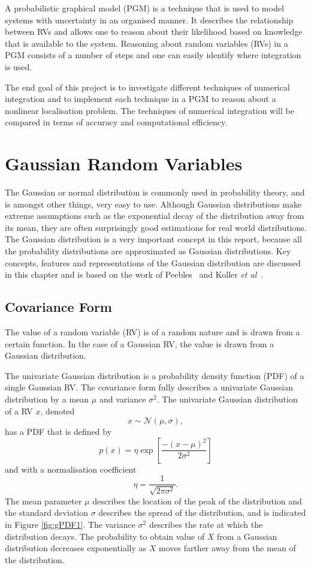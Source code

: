 \documentclass[12pt,oneside,openany,a4paper, %
afrikaans,english,
]{memoir}
\numberwithin{equation}{chapter}
\begin{document}
{A probabilistic graphical model (PGM) is a technique that is used to model systems with uncertainty in an organised manner. It describes the relationship between RVs and allows one to reason about their likelihood based on knowledge that is available to the system. Reasoning about random variables (RVs) in a PGM consists of a number of steps and one can easily identify where integration is used.

The end goal of this project is to investigate different techniques of numerical integration and to implement each technique in a PGM to reason about a nonlinear localisation problem. The techniques of numerical integration will be compared in terms of accuracy and computational efficiency.
\setcounter{secnumdepth}{2}
\chapter{Gaussian Random Variables}
The Gaussian or normal distribution is commonly used in probability theory, and is amongst other things, very easy to use. Although Gaussian distributions make extreme assumptions such as the exponential decay of the distribution away from its mean, they are often surprisingly good estimations for real world distributions. The Gaussian distribution is a very important concept in this report, because all the probability distributions are approximated as Gaussian distributions. Key concepts, features and representations of the Gaussian distribution are discussed in this chapter and is based on the work of Peebles~\cite{peebles} and Koller \textit{et al}~\cite{koller}.

\section{Covariance Form}
The value of a random variable (RV) is of a random nature and is drawn from a certain function. In the case of a Gaussian RV, the value is drawn from a Gaussian distribution.

The univariate Gaussian distribution is a probability density function (PDF) of a single Gaussian RV. The covariance form fully describes a univariate Gaussian distribution by a mean $\mu$ and variance $\sigma^2$.
The univariate Gaussian distribution of a RV $x$, denoted
\begin{equation}
x\sim\mathcal{N}(\mu,\sigma),
\end{equation}
has a PDF that is defined by
\begin{equation}\label{eq:1}
p(x) = \eta\exp\left[\frac{-(x-\mu)^2}{2\sigma^2}\right]
\end{equation}
and with a normalisation coefficient 
\begin{equation}\label{eq:2}
\eta = \frac{1}{\sqrt{2\pi\sigma^2}}.
\end{equation}
The mean parameter $\mu$ describes the location of the peak of the distribution and the standard deviation $\sigma$ describes the spread of the distribution, and is indicated in Figure \ref{fig:gPDF1}. The variance $\sigma^2$ describes the rate at which the distribution decays. The probability to obtain value of $X$ from a Gaussian distribution decreases exponentially as $X$ moves farther away from the mean of the distribution.

}
\end{document}
